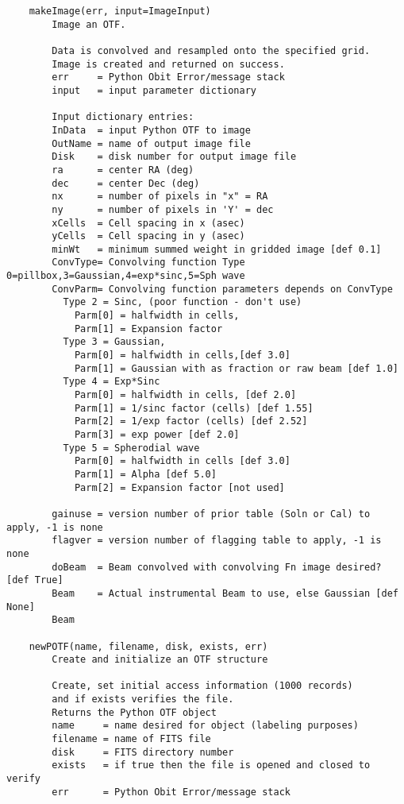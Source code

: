\documentclass[11pt]{report}
\begin{document}
\begin{verbatim}
    makeImage(err, input=ImageInput)
        Image an OTF.
        
        Data is convolved and resampled onto the specified grid.
        Image is created and returned on success.
        err     = Python Obit Error/message stack
        input   = input parameter dictionary
        
        Input dictionary entries:
        InData  = input Python OTF to image
        OutName = name of output image file
        Disk    = disk number for output image file
        ra      = center RA (deg)
        dec     = center Dec (deg)
        nx      = number of pixels in "x" = RA
        ny      = number of pixels in 'Y' = dec
        xCells  = Cell spacing in x (asec)
        yCells  = Cell spacing in y (asec)
        minWt   = minimum summed weight in gridded image [def 0.1]
        ConvType= Convolving function Type 0=pillbox,3=Gaussian,4=exp*sinc,5=Sph wave
        ConvParm= Convolving function parameters depends on ConvType
          Type 2 = Sinc, (poor function - don't use)
            Parm[0] = halfwidth in cells,
            Parm[1] = Expansion factor
          Type 3 = Gaussian,
            Parm[0] = halfwidth in cells,[def 3.0]
            Parm[1] = Gaussian with as fraction or raw beam [def 1.0]
          Type 4 = Exp*Sinc
            Parm[0] = halfwidth in cells, [def 2.0]
            Parm[1] = 1/sinc factor (cells) [def 1.55]
            Parm[2] = 1/exp factor (cells) [def 2.52]
            Parm[3] = exp power [def 2.0]
          Type 5 = Spherodial wave 
            Parm[0] = halfwidth in cells [def 3.0]
            Parm[1] = Alpha [def 5.0]
            Parm[2] = Expansion factor [not used]
        
        gainuse = version number of prior table (Soln or Cal) to apply, -1 is none
        flagver = version number of flagging table to apply, -1 is none
        doBeam  = Beam convolved with convolving Fn image desired? [def True]
        Beam    = Actual instrumental Beam to use, else Gaussian [def None]
        Beam
    
    newPOTF(name, filename, disk, exists, err)
        Create and initialize an OTF structure
        
        Create, set initial access information (1000 records)
        and if exists verifies the file.
        Returns the Python OTF object
        name     = name desired for object (labeling purposes)
        filename = name of FITS file
        disk     = FITS directory number
        exists   = if true then the file is opened and closed to verify
        err      = Python Obit Error/message stack


\end{verbatim}
\end{document}
